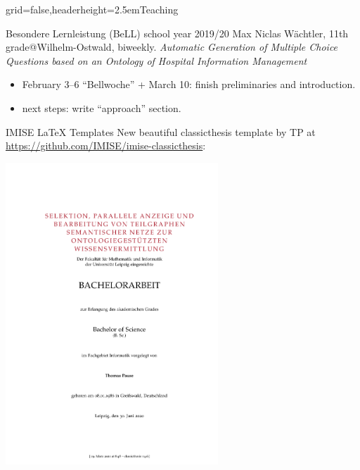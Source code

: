 \documentclass[]{kiesgrube}
\begin{document}
\begin{poster}%
{grid=false,headerheight=2.5em}{}{Teaching}{}

\begin{posterbox}[name=person,column=0,row=0]{Besondere Lernleistung (BeLL) school year 2019/20}
Max Niclas Wächtler, 11th grade@Wilhelm-Ostwald, biweekly.
\emph{Automatic Generation of Multiple Choice Questions based on an Ontology of Hospital Information Management}
\begin{itemize}
\item February 3--6 \enquote{Bellwoche} + March 10: finish preliminaries and introduction.
\item next steps: write \enquote{approach} section.
\end{itemize}
\end{posterbox}
\begin{posterbox}[name=risks,column=1,row=0]{IMISE LaTeX Templates}
New beautiful classicthesis template by TP at \url{https://github.com/IMISE/imise-classicthesis}:
\begin{center}
\includegraphics[width=0.6\textwidth,trim=5.5cm 8cm 2.5cm 6cm,clip]{img/tp_ba_s1.pdf}
\end{center}

\end{posterbox}
\end{poster}
\end{document}
